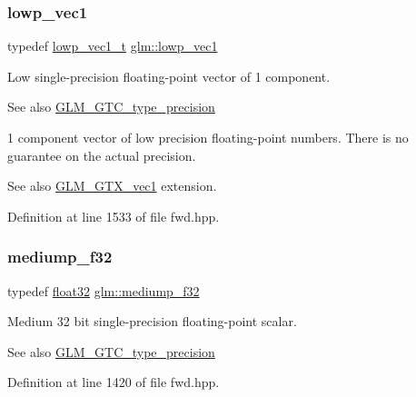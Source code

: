 \subsubsection{\texorpdfstring{lowp\+\_\+vec1}{lowp\_vec1}}
{\footnotesize\ttfamily typedef \hyperlink{namespaceglm_a6f4858c888bac87e7fbae4addee5719b}{lowp\+\_\+vec1\+\_\+t} \hyperlink{group__gtc__type__precision_gae48c64f920be353ece773ff367f0161c}{glm\+::lowp\+\_\+vec1}}

Low single-\/precision floating-\/point vector of 1 component. \begin{DoxySeeAlso}{See also}
\hyperlink{group__gtc__type__precision}{G\+L\+M\+\_\+\+G\+T\+C\+\_\+type\+\_\+precision}
\end{DoxySeeAlso}
1 component vector of low precision floating-\/point numbers. There is no guarantee on the actual precision. \begin{DoxySeeAlso}{See also}
\hyperlink{group__gtx__vec1}{G\+L\+M\+\_\+\+G\+T\+X\+\_\+vec1} extension. 
\end{DoxySeeAlso}


Definition at line 1533 of file fwd.\+hpp.

\mbox{\label{group__gtc__type__precision_ga3dbba6bd06a546d7a11d1c09c2f04b1a}} 
\subsubsection{\texorpdfstring{mediump\+\_\+f32}{mediump\_f32}}
{\footnotesize\ttfamily typedef \hyperlink{group__gtc__type__precision_ga814f2f65354b6588b067cc5c67a6b340}{float32} \hyperlink{group__gtc__type__precision_ga3dbba6bd06a546d7a11d1c09c2f04b1a}{glm\+::mediump\+\_\+f32}}

Medium 32 bit single-\/precision floating-\/point scalar. \begin{DoxySeeAlso}{See also}
\hyperlink{group__gtc__type__precision}{G\+L\+M\+\_\+\+G\+T\+C\+\_\+type\+\_\+precision} 
\end{DoxySeeAlso}


Definition at line 1420 of file fwd.\+hpp.

\mbox{\label{group__gtc__type__precision_ga103735a38477f7c389b36aae0fbdf274}} 
